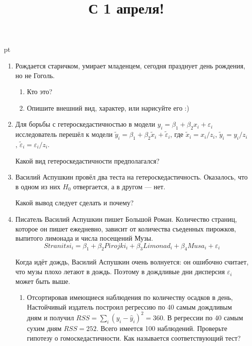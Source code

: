 \documentclass[pdftex,12pt,a4paper]{article}
\title{С 1 апреля!}
\date{}
\begin{document}
\maketitle
{} pt %



\begin{enumerate}

\item Рождается старичком, умирает младенцем, сегодня празднует день рождения, но не Гоголь. 
\begin{enumerate}
\item Кто это?
\item Опишите внешний вид, характер, или нарисуйте его :)
\end{enumerate}

\item Для борьбы с гетероскедастичностью в модели $y_i=\beta_1+\beta_2 x_i+\varepsilon_i$ исследователь перешёл к модели $\tilde{y}_i=\beta_1+\beta_2 \tilde{x}_i+\tilde{\varepsilon}_i$, где $\tilde{x}_i=x_i/z_i$, $\tilde{y}_i=y_i/z_i$, $\tilde{\varepsilon}_i=\varepsilon_i/z_i$. 

Какой вид гетероскедастичности предполагался?

\item Василий Аспушкин провёл два теста на гетероскедастичность. Оказалось, что в одном из них $H_0$ отвергается, а в другом --- нет. 

Какой вывод следует сделать и почему?


\item Писатель Василий Аспушкин пишет Большой Роман. Количество страниц, которое он пишет ежедневно, зависит от количества съеденных пирожков, выпитого лимонада и числа посещений Музы. 
\[
Stranitsi_i = \beta_1 + \beta_2 Pirojki_i + \beta_3 Limonad_i + \beta_4 Musa_i + \varepsilon_i
\]

Когда идёт дождь, Василий Аспушкин очень волнуется: он ошибочно считает, что музы плохо летают в дождь. Поэтому в дождливые дни дисперсия $\varepsilon_i$ может быть выше. 


\begin{enumerate}
\item Отсортировав имеющиеся наблюдения по количеству осадков в день, Настойчивый издатель построил регрессию по 40 самым дождливым дням и получил $RSS=\sum_i (y_i-\hat{y}_i)^2=360$. В регрессии по 40 самым сухим дням $RSS=252$. Всего имеется 100 наблюдений. Проверьте гипотезу о гомоскедастичности. Как называется соответствующий тест?


\end{enumerate}
\end{enumerate}
\end{document}
